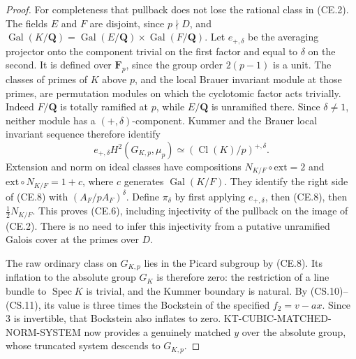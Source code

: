 \documentclass[11pt,a4paper]{article}
\theoremstyle{definition}
\begin{document}
\begin{proof}
For completeness that pullback does not lose the rational
class in (CE.2).  The fields \(E\) and \(F\) are disjoint,
since \(p\nmid D\), and
\(\operatorname{Gal}(K/\mathbf Q)
  =\operatorname{Gal}(E/\mathbf Q)\times\operatorname{Gal}(F/\mathbf Q)\).
Let \(e_{+,\delta}\) be the averaging projector onto the
component trivial on the first factor and equal to \(\delta\)
on the second.  It is defined over \(\mathbf F_p\), since
the group order \(2(p-1)\) is a unit.
The classes of primes of \(K\) above \(p\), and the local
Brauer invariant module at those primes, are permutation
modules on which the cyclotomic factor acts trivially.
Indeed \(F/\mathbf Q\) is totally ramified at \(p\), while
\(E/\mathbf Q\) is unramified there.  Since \(\delta\ne1\),
neither module has a \((+,\delta)\)-component.  Kummer and
the Brauer local invariant sequence therefore identify
\[
 e_{+,\delta} H^2(G_{K,p},\mu_p)
       \simeq (\operatorname{Cl}(K)/p)^{{+,\delta}}.
                                                        \tag{CE.8}
\]
Extension and norm on ideal classes have compositions
\(N_{K/F}\circ\mathrm{ext}=2\) and
\(\mathrm{ext}\circ N_{K/F}=1+c\), where
\(c\) generates \(\operatorname{Gal}(K/F)\).
They identify the right side of (CE.8) with
\((A_F/pA_F)^\delta\).  Define \(\pi_\delta\) by first
applying \(e_{+,\delta}\), then (CE.8), then
\(\tfrac12N_{K/F}\).  This proves (CE.6), including
injectivity of the pullback on the image of (CE.2).
There is no need to infer this injectivity from a putative
unramified Galois cover at the primes over \(D\).

The raw ordinary class on \(G_{K,p}\) lies in the
Picard subgroup by (CE.8).  Its inflation to the
absolute group \(G_K\) is therefore zero: the
restriction of a line bundle to \(\operatorname{Spec}K\)
is trivial, and the Kummer boundary is natural.
By (CS.10)--(CS.11), its value is three times the
Bockstein of the specified \(f_2=v-ax\).  Since
\(3\) is invertible, that Bockstein also inflates
to zero.  KT-CUBIC-MATCHED-NORM-SYSTEM now provides
a genuinely matched \(y\) over the absolute group,
whose truncated system descends to \(G_{K,p}\).


\end{proof}
\end{document}
